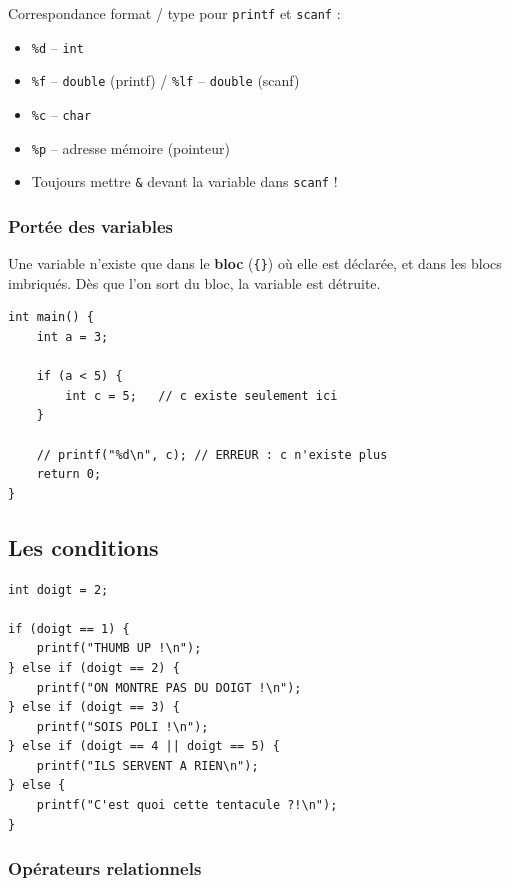 \documentclass[12pt,a4paper]{article}
\begin{document}
\begin{regle}
Correspondance format / type pour \texttt{printf} et \texttt{scanf} :
\begin{itemize}
    \item \texttt{\%d} -- \texttt{int}
    \item \texttt{\%f} -- \texttt{double} (printf) / \texttt{\%lf} -- \texttt{double} (scanf)
    \item \texttt{\%c} -- \texttt{char}
    \item \texttt{\%p} -- adresse mémoire (pointeur)
    \item Toujours mettre \texttt{\&} devant la variable dans \texttt{scanf} !
\end{itemize}
\end{regle}

\subsubsection{Portée des variables}

Une variable n'existe que dans le \textbf{bloc} (\texttt{\{\}}) où elle est déclarée, et dans les blocs imbriqués. Dès que l'on sort du bloc, la variable est détruite.

\begin{lstlisting}[caption={Portée locale}]
int main() {
    int a = 3;

    if (a < 5) {
        int c = 5;   // c existe seulement ici
    }

    // printf("%d\n", c); // ERREUR : c n'existe plus
    return 0;
}
\end{lstlisting}

\subsection{Les conditions}

\begin{lstlisting}[caption={Conditions if / else if / else}]
int doigt = 2;

if (doigt == 1) {
    printf("THUMB UP !\n");
} else if (doigt == 2) {
    printf("ON MONTRE PAS DU DOIGT !\n");
} else if (doigt == 3) {
    printf("SOIS POLI !\n");
} else if (doigt == 4 || doigt == 5) {
    printf("ILS SERVENT A RIEN\n");
} else {
    printf("C'est quoi cette tentacule ?!\n");
}
\end{lstlisting}

\subsubsection{Opérateurs relationnels}
\end{document}

